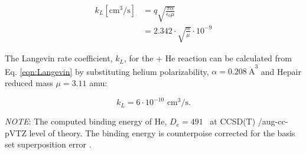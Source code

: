 \begin{equation}
    \begin{split}
        k_L [\text{cm}^3 / \text{s}] & = q \sqrt{\frac{\pi \alpha}{\epsilon _0 \mu}} \\
        &= 2.342 \cdot \sqrt{ \frac{\alpha}{\mu}} \cdot 10^{-9} 
   \end{split}
   \label{eqn:Langevin}
\end{equation}


The Langevin rate coefficient, $k_L$, for the \CD + He reaction can be calculated from Eq. \ref{eqn:Langevin} by substituting helium polarizability, $\alpha=0.208\  \mathring{\text{A}}^3$ \cite{olney_absolute_1997} and He\CD pair reduced mass $\mu=3.11$ amu:

\begin{equation}
        k_L = 6 \cdot 10^{-10} \text{ cm}^3 / \text{s}.
   \label{eqn:Langevin-CD+}
\end{equation}

\emph{NOTE}: The computed binding energy of He\CD, $D_e=491$ \wn\ at CCSD(T) /aug-cc-pVTZ level of theory. The binding energy is counterpoise corrected for the basis set superposition error \cite{boys_calculation_1970}.
